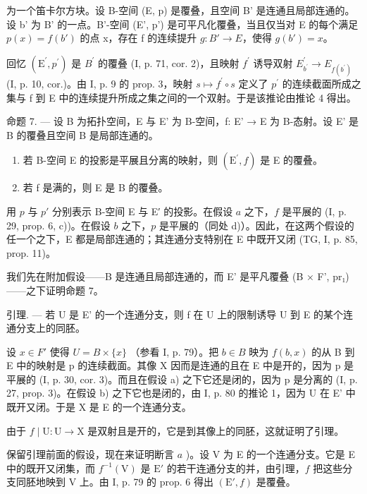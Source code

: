 为一个笛卡尔方块。设 B-空间 (E, p) 是覆叠，且空间 B' 是连通且局部连通的。设 b' 为 B' 的一点。B'-空间 (E', p') 是可平凡化覆叠，当且仅当对 E 的每个满足 \(p(x) = f(b')\) 的点 x，存在 f 的连续提升 \(g: B' \to E\)，使得 \(g(b') = x\)。

回忆 \((\mathrm{E}^{\prime}, p^{\prime})\) 是 \(B^{\prime}\) 的覆叠 (I, p. 71, cor. 2)，且映射 \(f^{\prime}\) 诱导双射 \(E_{b^{\prime}}^{\prime} \to E_{f(b^{\prime})}\) (I, p. 10, cor.)。由 I, p. 9 的 prop. 3，映射 \(s \mapsto f^{\prime} \circ s\) 定义了 \(p^{\prime}\) 的连续截面所成之集与 f 到 E 中的连续提升所成之集之间的一个双射。于是该推论由推论 4 得出。

命题 7. --- 设 B 为拓扑空间，E 与 E' 为 B-空间，f: E' → E 为 B-态射。设 E' 是 B 的覆叠且空间 B 是局部连通的。

\begin{enumerate}
\def\labelenumi{\alph{enumi})}
\item
  若 B-空间 E 的投影是平展且分离的映射，则 \((\mathrm{E}^{\prime}, f)\) 是 E 的覆叠。
\item
  若 f 是满的，则 E 是 B 的覆叠。
\end{enumerate}

用 \(p\) 与 \(p'\) 分别表示 B-空间 E 与 E′ 的投影。在假设 \(a\) 之下，\(f\) 是平展的 (I, p. 29, prop. 6, c))。在假设 \(b\) 之下，\(p\) 是平展的（同处 d)）。因此，在这两个假设的任一个之下，E 都是局部连通的；其连通分支特别在 E 中既开又闭 (TG, I, p. 85, prop. 11)。

我们先在附加假设——B 是连通且局部连通的，而 E' 是平凡覆叠 (B × F', pr₁)——之下证明命题 7。

引理. --- 若 U 是 E' 的一个连通分支，则 f 在 U 上的限制诱导 U 到 E 的某个连通分支上的同胚。

设 \(x \in F'\) 使得 \(U = B \times \{x\}\) （参看 I, p. 79）。把 \(b \in B\) 映为 \(f(b, x)\) 的从 B 到 E 中的映射是 p 的连续截面。其像 X 因而是连通的且在 E 中是开的，因为 p 是平展的 (I, p. 30, cor. 3)。而且在假设 a) 之下它还是闭的，因为 p 是分离的 (I, p. 27, prop. 3)。在假设 b) 之下它也是闭的，由 I, p. 80 的推论 1，因为 U 在 E' 中既开又闭。于是 X 是 E 的一个连通分支。

由于 \(f \mid \mathrm{U} \colon \mathrm{U} \to \mathrm{X}\) 是双射且是开的，它是到其像上的同胚，这就证明了引理。

保留引理前面的假设，现在来证明断言 \(a\) )。设 V 为 E 的一个连通分支。它是 E 中的既开又闭集，而 \(f^{-1}(\mathrm{V})\) 是 \(\mathrm{E}'\) 的若干连通分支的并，由引理，\(f\) 把这些分支同胚地映到 V 上。由 I, p. 79 的 prop. 6 得出 \((\mathrm{E}', f)\) 是覆叠。

